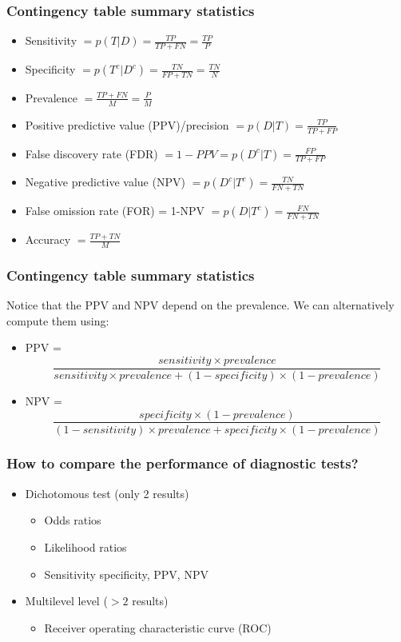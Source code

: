 \begin{frame}
\frametitle{Contingency table summary statistics}
\begin{itemize}
	\item \alert{Sensitivity} $= p(T|D) = \frac{TP}{TP+FN}=\frac{TP}{P} $
	\pause
	\item \alert{Specificity} $= p(T^c|D^c) = \frac{TN}{FP+TN}=\frac{TN}{N}$
	\pause
	\item \alert{Prevalence} $= \frac{TP+FN}{M}=\frac{P}{M}$
	\pause
	\item \alert{Positive predictive value (PPV)/precision} $= p(D|T) = \frac{TP}{TP+FP}$
	\pause
	\item \alert{False discovery rate (FDR)} $= 1-PPV = p(D^c|T) = \frac{FP}{TP+FP}$
	\pause
	\item \alert{Negative predictive value (NPV)} $= p(D^c|T^c) = \frac{TN}{FN+TN}$
	\pause
		\item \alert{False omission rate (FOR)} = 1-NPV $= p(D|T^c) = \frac{FN}{FN+TN}$
	\pause
	\item \alert{Accuracy} $= \frac{TP+TN}{M}$
\end{itemize}
\end{frame}

\begin{frame}
\frametitle{Contingency table summary statistics}
Notice that the PPV and NPV depend on the prevalence. We can alternatively compute them using:
\begin{itemize}
	\item PPV = 
	$$
	\frac{sensitivity \times prevalence}{sensitivity \times prevalence + (1- specificity) \times (1-prevalence)}
	$$
		\item NPV =
		$$
		\frac{specificity \times (1-prevalence)}{(1-sensitivity) \times prevalence + specificity \times (1-prevalence)}
		$$
\end{itemize}
\end{frame}


\begin{frame}
\frametitle{How to compare the performance of diagnostic tests?}

\begin{itemize}
\item Dichotomous test (only 2 results)
\pause
\begin{itemize}
\item Odds ratios
\item Likelihood ratios
\item Sensitivity specificity, PPV, NPV

\end{itemize}

\pause
\item Multilevel level ($>2$ results)
\pause
\begin{itemize}
\item Receiver operating characteristic curve (ROC)
\end{itemize}
\end{itemize}
\end{frame} 

